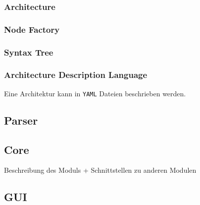 \subsubsection{Architecture}

\subsubsection{Node Factory}

\subsubsection{Syntax Tree}

\subsubsection{Architecture Description Language}

Eine Architektur kann in \texttt{YAML} Dateien beschrieben werden.


\subsection{Parser}

\subsection{Core}

Beschreibung des Moduls + Schnittstellen zu anderen Modulen

\subsection{GUI}
